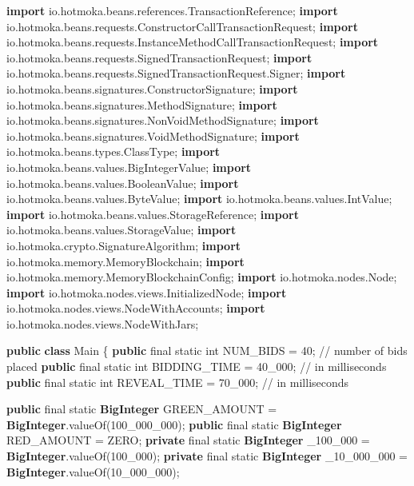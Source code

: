 \documentclass[a4paper,]{book}
\newenvironment{Shaded}{\begin{snugshade}}{\end{snugshade}}
\newcommand{\BuiltInTok}[1]{\textcolor[rgb]{0.39,0.29,0.61}{\textbf{#1}}}
\newcommand{\CommentTok}[1]{\textcolor[rgb]{0.54,0.53,0.53}{#1}}
\newcommand{\DataTypeTok}[1]{\textcolor[rgb]{0.00,0.34,0.68}{#1}}
\newcommand{\DecValTok}[1]{\textcolor[rgb]{0.69,0.50,0.00}{#1}}
\newcommand{\FunctionTok}[1]{\textcolor[rgb]{0.39,0.29,0.61}{#1}}
\newcommand{\ImportTok}[1]{\textcolor[rgb]{1.00,0.33,0.00}{#1}}
\newcommand{\KeywordTok}[1]{\textcolor[rgb]{0.12,0.11,0.11}{\textbf{#1}}}
\newcommand{\NormalTok}[1]{\textcolor[rgb]{0.12,0.11,0.11}{#1}}
\renewenvironment{Shaded}{\begin{snugshade}\small}{\end{snugshade}}
\begin{document}
{\begin{Shaded}
\begin{Highlighting}[]
\KeywordTok{import}\ImportTok{ io.hotmoka.beans.references.TransactionReference;}
\KeywordTok{import}\ImportTok{ io.hotmoka.beans.requests.ConstructorCallTransactionRequest;}
\KeywordTok{import}\ImportTok{ io.hotmoka.beans.requests.InstanceMethodCallTransactionRequest;}
\KeywordTok{import}\ImportTok{ io.hotmoka.beans.requests.SignedTransactionRequest;}
\KeywordTok{import}\ImportTok{ io.hotmoka.beans.requests.SignedTransactionRequest.Signer;}
\KeywordTok{import}\ImportTok{ io.hotmoka.beans.signatures.ConstructorSignature;}
\KeywordTok{import}\ImportTok{ io.hotmoka.beans.signatures.MethodSignature;}
\KeywordTok{import}\ImportTok{ io.hotmoka.beans.signatures.NonVoidMethodSignature;}
\KeywordTok{import}\ImportTok{ io.hotmoka.beans.signatures.VoidMethodSignature;}
\KeywordTok{import}\ImportTok{ io.hotmoka.beans.types.ClassType;}
\KeywordTok{import}\ImportTok{ io.hotmoka.beans.values.BigIntegerValue;}
\KeywordTok{import}\ImportTok{ io.hotmoka.beans.values.BooleanValue;}
\KeywordTok{import}\ImportTok{ io.hotmoka.beans.values.ByteValue;}
\KeywordTok{import}\ImportTok{ io.hotmoka.beans.values.IntValue;}
\KeywordTok{import}\ImportTok{ io.hotmoka.beans.values.StorageReference;}
\KeywordTok{import}\ImportTok{ io.hotmoka.beans.values.StorageValue;}
\KeywordTok{import}\ImportTok{ io.hotmoka.crypto.SignatureAlgorithm;}
\KeywordTok{import}\ImportTok{ io.hotmoka.memory.MemoryBlockchain;}
\KeywordTok{import}\ImportTok{ io.hotmoka.memory.MemoryBlockchainConfig;}
\KeywordTok{import}\ImportTok{ io.hotmoka.nodes.Node;}
\KeywordTok{import}\ImportTok{ io.hotmoka.nodes.views.InitializedNode;}
\KeywordTok{import}\ImportTok{ io.hotmoka.nodes.views.NodeWithAccounts;}
\KeywordTok{import}\ImportTok{ io.hotmoka.nodes.views.NodeWithJars;}

\KeywordTok{public} \KeywordTok{class}\NormalTok{ Main \{}
  \KeywordTok{public} \DataTypeTok{final} \DataTypeTok{static} \DataTypeTok{int}\NormalTok{ NUM_BIDS = }\DecValTok{40}\NormalTok{; }\CommentTok{// number of bids placed}
  \KeywordTok{public} \DataTypeTok{final} \DataTypeTok{static} \DataTypeTok{int}\NormalTok{ BIDDING_TIME = }\DecValTok{40_000}\NormalTok{; }\CommentTok{// in milliseconds}
  \KeywordTok{public} \DataTypeTok{final} \DataTypeTok{static} \DataTypeTok{int}\NormalTok{ REVEAL_TIME = }\DecValTok{70_000}\NormalTok{; }\CommentTok{// in milliseconds}

  \KeywordTok{public} \DataTypeTok{final} \DataTypeTok{static} \BuiltInTok{BigInteger}\NormalTok{ GREEN_AMOUNT = }\BuiltInTok{BigInteger}\NormalTok{.}\FunctionTok{valueOf}\NormalTok{(}\DecValTok{100_000_000}\NormalTok{);}
  \KeywordTok{public} \DataTypeTok{final} \DataTypeTok{static} \BuiltInTok{BigInteger}\NormalTok{ RED_AMOUNT = ZERO;}
  \KeywordTok{private} \DataTypeTok{final} \DataTypeTok{static} \BuiltInTok{BigInteger}\NormalTok{ _}\DecValTok{100_000}\NormalTok{ = }\BuiltInTok{BigInteger}\NormalTok{.}\FunctionTok{valueOf}\NormalTok{(}\DecValTok{100_000}\NormalTok{);}
  \KeywordTok{private} \DataTypeTok{final} \DataTypeTok{static} \BuiltInTok{BigInteger}\NormalTok{ _}\DecValTok{10_000_000}\NormalTok{ = }\BuiltInTok{BigInteger}\NormalTok{.}\FunctionTok{valueOf}\NormalTok{(}\DecValTok{10_000_000}\NormalTok{);}


\end{Highlighting}
\end{Shaded}}
\end{document}
